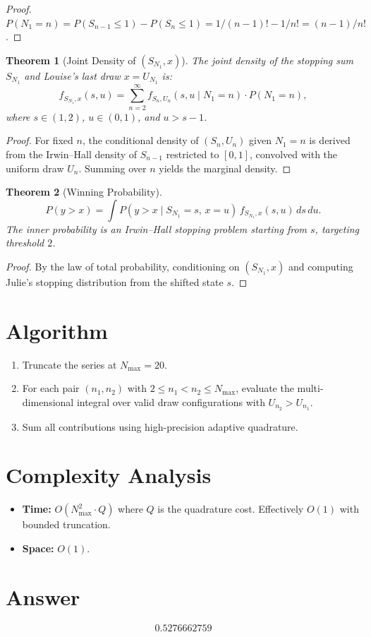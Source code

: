 \documentclass[11pt]{article}
\newtheorem{theorem}{Theorem}
\begin{document}
\begin{proof}
$P(N_1 = n) = P(S_{n-1} \leq 1) - P(S_n \leq 1) = 1/(n-1)! - 1/n! = (n-1)/n!$.
\end{proof}

\begin{theorem}[Joint Density of $(S_{N_1}, x)$]
The joint density of the stopping sum $S_{N_1}$ and Louise's last draw $x = U_{N_1}$ is:
\[
f_{S_{N_1}, x}(s, u) = \sum_{n=2}^{\infty} f_{S_n, U_n}(s, u \mid N_1 = n) \cdot P(N_1 = n),
\]
where $s \in (1, 2)$, $u \in (0, 1)$, and $u > s - 1$.
\end{theorem}

\begin{proof}
For fixed $n$, the conditional density of $(S_n, U_n)$ given $N_1 = n$ is derived from the Irwin--Hall density of $S_{n-1}$ restricted to $[0, 1]$, convolved with the uniform draw $U_n$. Summing over $n$ yields the marginal density.
\end{proof}

\begin{theorem}[Winning Probability]
\[
P(y > x) = \int P(y > x \mid S_{N_1} = s,\, x = u)\, f_{S_{N_1}, x}(s, u)\, ds\, du.
\]
The inner probability is an Irwin--Hall stopping problem starting from $s$, targeting threshold $2$.
\end{theorem}

\begin{proof}
By the law of total probability, conditioning on $(S_{N_1}, x)$ and computing Julie's stopping distribution from the shifted state $s$.
\end{proof}

\section{Algorithm}
\begin{enumerate}
    \item Truncate the series at $N_{\max} = 20$.
    \item For each pair $(n_1, n_2)$ with $2 \leq n_1 < n_2 \leq N_{\max}$, evaluate the multi-dimensional integral over valid draw configurations with $U_{n_2} > U_{n_1}$.
    \item Sum all contributions using high-precision adaptive quadrature.
\end{enumerate}

\section{Complexity Analysis}
\begin{itemize}
    \item \textbf{Time:} $O(N_{\max}^2 \cdot Q)$ where $Q$ is the quadrature cost. Effectively $O(1)$ with bounded truncation.
    \item \textbf{Space:} $O(1)$.
\end{itemize}

\section{Answer}

\[
\boxed{0.5276662759}
\]
\end{document}
